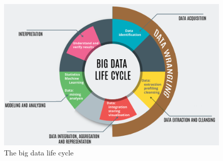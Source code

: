 \begin{figure}[H]
	\centering
	\includegraphics[scale=.3]{big_data_life_cycle}
	\caption{The big data life cycle}
	\label{fig:img_big_data_life_cycle}
\end{figure}



